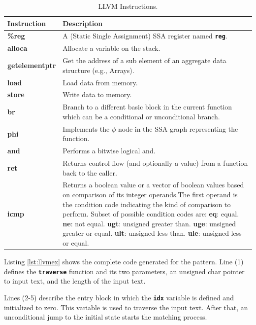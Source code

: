 {\renewcommand{\arraystretch}{1.5}%
\begin{table}[H]
\centering
\small
\begin{tabularx}{\textwidth}{|l|X|}
\hline
Instruction        & Description  \\
\hline
\textbf{\%reg} & A (Static Single Assignment) SSA register named \texttt{\textbf{reg}}.\\
\hline
\textbf{alloca} & Allocate a variable on the stack.\\
\hline
\textbf{getelementptr} & Get the address of a sub element of an aggregate data structure (e.g., Arrays).\\
\hline
\textbf{load} & Load data from memory.\\
\hline
\textbf{store} & Write data to memory.\\
\hline
\textbf{br} & Branch to a different basic block in the current function which can be a conditional or unconditional branch. \\
\hline
\textbf{phi} & Implements the $\phi$ node in the SSA graph representing the function.\\
\hline
\textbf{and} & Performs a bitwise logical and.\\
\hline
\textbf{ret} & Returns control flow (and optionally a value) from a function back to the caller.\\
\hline
\textbf{icmp} &
Returns a boolean value or a vector of boolean values based on comparison of its integer operands.The first operand is the condition code indicating the kind of comparison to perform. Subset of possible condition codes are:\newline
\textbf{eq}: equal. \textbf{ne}: not equal. \textbf{ugt}: unsigned greater than.
\textbf{uge}: unsigned greater or equal. \textbf{ult}: unsigned less than. \textbf{ule}: unsigned less or equal.\\
\hline
\end{tabularx}
\caption[LLVM Instructions]{LLVM Instructions.}\label{tab:llvminst}
\end{table}}

Listing \ref{lst:llvmex} shows the complete code generated for the pattern. Line (1) defines the \texttt{\textbf{traverse}} function and its two parameters, an unsigned char pointer to input text, and the length of the input text.

Lines (2-5) describe the entry block in which the \texttt{\textbf{idx}} variable is defined and initialized to zero. This variable is used to traverse the input text. After that, an unconditional jump to the initial state starts the matching process.

